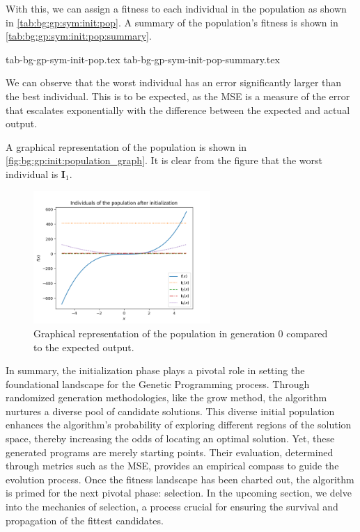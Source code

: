   With this, we can assign a fitness to each individual in the population as
  shown in \vref{tab:bg:gp:sym:init:pop}.
  A summary of the population's fitness is shown in
  \vref{tab:bg:gp:sym:init:pop:summary}.

  {tab-bg-gp-sym-init-pop.tex}
  {tab-bg-gp-sym-init-pop-summary.tex}

  We can observe that the worst individual has an error significantly larger
  than the best individual.
  This is to be expected, as the MSE is a measure of the error that escalates
  exponentially with the difference between the expected and actual output.  

  A graphical representation of the population is shown in
  \vref{fig:bg:gp:init:population_graph}.
  It is clear from the figure that the worst individual is \(\mathbf{I}_1\).

  \begin{figure}[ht!]
    \centering
    \includegraphics[width=0.6\textwidth]
      {img/theoretical_framework/gp_pop_init.png}
    \caption{
      Graphical representation of the population in generation 0 compared to the
      expected output.
    }
    \label{fig:bg:gp:init:population_graph}
  \end{figure}

  In summary, the initialization phase plays a pivotal role in setting the 
  foundational landscape for the Genetic Programming process. Through randomized 
  generation methodologies, like the grow method, the algorithm nurtures a 
  diverse pool of candidate solutions. This diverse initial population enhances 
  the algorithm's probability of exploring different regions of the solution 
  space, thereby increasing the odds of locating an optimal solution. Yet, these 
  generated programs are merely starting points. Their evaluation, determined 
  through metrics such as the MSE, provides an empirical compass to guide the 
  evolution process. Once the fitness landscape has been charted out, the 
  algorithm is primed for the next pivotal phase: selection. In the upcoming 
  section, we delve into the mechanics of selection, a process crucial for 
  ensuring the survival and propagation of the fittest candidates.
